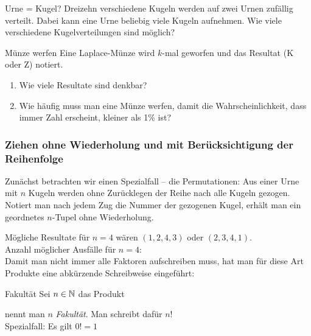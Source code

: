 \begin{bsp}{Urne = Kugel?}{}
    Dreizehn verschiedene Kugeln werden auf zwei Urnen zufällig verteilt. Dabei kann eine Urne beliebig viele Kugeln aufnehmen. Wie viele verschiedene Kugelverteilungen sind möglich?

    \vspace{2cm}
\end{bsp}

\begin{bsp}
    {Münze werfen}{}
    Eine Laplace-Münze wird \(k\)-mal geworfen und das Resultat (K oder Z) notiert.

    \begin{enumerate}
        \item Wie viele Resultate sind denkbar?
              \vspace{2cm}
        \item Wie häufig muss man eine Münze werfen, damit die Wahrscheinlichkeit, dass immer Zahl erscheint, kleiner als 1\% ist?
              \vspace{4cm}
    \end{enumerate}
\end{bsp}


















\subsubsection{Ziehen ohne Wiederholung und mit Berücksichtigung der Reihenfolge}
Zunächst betrachten wir einen Spezialfall – die Permutationen: Aus einer Urne mit \(n\) Kugeln werden ohne Zurücklegen der Reihe nach alle Kugeln gezogen. Notiert man nach jedem Zug die Nummer der gezogenen Kugel, erhält man ein geordnetes \(n\)-Tupel ohne Wiederholung.

Mögliche Resultate für \(n=4\) wären \((1,2,4,3)\) oder \((2,3,4,1)\). \\

Anzahl möglicher Ausfälle für \(n=4\): \\

Damit man nicht immer alle Faktoren aufschreiben muss, hat man für diese Art Produkte eine abkürzende Schreibweise eingeführt:

\begin{definition}
    {Fakultät}{}
    Sei \(n\in\mathbb{N}\) das Produkt

    \vspace{1cm}

    nennt man \(n\) \emph{Fakultät}. Man schreibt dafür \(n!\)\\
    Spezialfall: Es gilt \(0! = 1\)
\end{definition}

